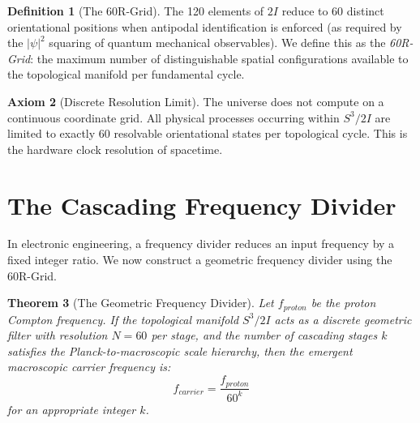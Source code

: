 \documentclass[12pt, a4paper]{article}
\theoremstyle{plain}
\newtheorem{theorem}{Theorem}[section]
\theoremstyle{definition}
\newtheorem{definition}[theorem]{Definition}
\newtheorem{axiom}[theorem]{Axiom}
\theoremstyle{remark}
\begin{document}
\begin{definition}[The 60R-Grid]
The 120 elements of $2I$ reduce to 60 distinct orientational positions when antipodal identification is enforced (as required by the $|\psi|^2$ squaring of quantum mechanical observables). We define this as the \emph{60R-Grid}: the maximum number of distinguishable spatial configurations available to the topological manifold per fundamental cycle.
\end{definition}

\begin{axiom}[Discrete Resolution Limit]
The universe does not compute on a continuous coordinate grid. All physical processes occurring within $S^3/2I$ are limited to exactly 60 resolvable orientational states per topological cycle. This is the hardware clock resolution of spacetime.
\end{axiom}

\section{The Cascading Frequency Divider}\label{sec:divider}

In electronic engineering, a frequency divider reduces an input frequency by a fixed integer ratio. We now construct a geometric frequency divider using the 60R-Grid.

\begin{theorem}[The Geometric Frequency Divider]\label{thm:divider}
Let $f_{proton}$ be the proton Compton frequency. If the topological manifold $S^3/2I$ acts as a discrete geometric filter with resolution $N = 60$ per stage, and the number of cascading stages $k$ satisfies the Planck-to-macroscopic scale hierarchy, then the emergent macroscopic carrier frequency is:
\begin{equation}\label{eq:divider}
    f_{carrier} = \frac{f_{proton}}{60^k}
\end{equation}
for an appropriate integer $k$.
\end{theorem}
\end{document}
